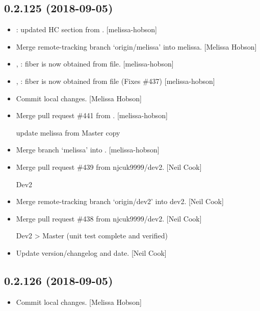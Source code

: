 \documentclass[a4paper,10pt,english]{report}
\begin{document}
\subsection{0.2.125 (2018-09-05)}
\label{\detokenize{misc/changelog:id336}}\begin{itemize}
\item {} 
: updated HC section from
. {[}melissa-hobson{]}

\item {} 
Merge remote-tracking branch ‘origin/melissa’ into melissa. {[}Melissa
Hobson{]}

\item {} 
, : fiber is now obtained from file.
{[}melissa-hobson{]}

\item {} 
, : fiber is now obtained from file
(Fixes \#437) {[}melissa-hobson{]}

\item {} 
Commit local changes. {[}Melissa Hobson{]}

\item {} 
Merge pull request \#441 from . {[}melissa-hobson{]}

update melissa from Master copy

\item {} 
Merge branch ‘melissa’ into . {[}melissa-hobson{]}

\item {} 
Merge pull request \#439 from njcuk9999/dev2. {[}Neil Cook{]}

Dev2

\item {} 
Merge remote-tracking branch ‘origin/dev2’ into dev2. {[}Neil Cook{]}

\item {} 
Merge pull request \#438 from njcuk9999/dev2. {[}Neil Cook{]}

Dev2 \textendash{}\textgreater{} Master (unit test complete and verified)

\item {} 
Update version/changelog and date. {[}Neil Cook{]}

\end{itemize}


\subsection{0.2.126 (2018-09-05)}
\label{\detokenize{misc/changelog:id337}}\begin{itemize}
\item {} 
Commit local changes. {[}Melissa Hobson{]}

\end{itemize}
\end{document}
